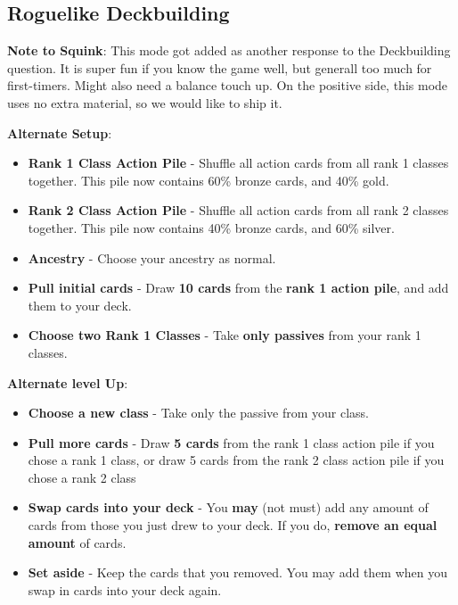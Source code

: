 \subsection*{Roguelike Deckbuilding} 

\textbf{Note to Squink}: This mode got added as another response to the Deckbuilding question. It is super fun if you know the game well, but generall too much for first-timers. Might also need a balance touch up. On the positive side, this mode uses no extra material, so we would like to ship it.

\begin{minipage}[t][7cm][t]{1\textwidth}
	\textbf{Alternate Setup}: 
	\begin{itemize}
		\item \textbf{Rank 1 Class Action Pile} - Shuffle all action cards from all rank 1 classes together. This pile now contains 60\% bronze cards, and 40\% gold.
		\item \textbf{Rank 2 Class Action Pile} - Shuffle all action cards from all rank 2 classes together. This pile now contains 40\% bronze cards, and 60\% silver.
		\item \textbf{Ancestry} - Choose your ancestry as normal.
		\item \textbf{Pull initial cards} - Draw \textbf{10 cards} from the \textbf{rank 1 action pile}, and add them to your deck.
		\item \textbf{Choose two Rank 1 Classes} - Take \textbf{only passives} from your rank 1 classes.
	\end{itemize}
	
	\textbf{Alternate level Up}: 
	\begin{itemize}
		\item \textbf{Choose a new class} - Take only the passive from your class.
		\item \textbf{Pull more cards} - Draw \textbf{5 cards} from the rank 1 class action pile if you chose a rank 1 class, or  draw 5 cards from the rank 2 class action pile if you chose a rank 2 class
		\item \textbf{Swap cards into your deck} - You \textbf{may} (not must) add any amount of cards from those you just drew to your deck. If you do, \textbf{remove an equal amount} of cards.
		\item \textbf{Set aside} - Keep the cards that you removed. You may add them when you swap in cards into your deck again.
		
	\end{itemize}
\end{minipage}

